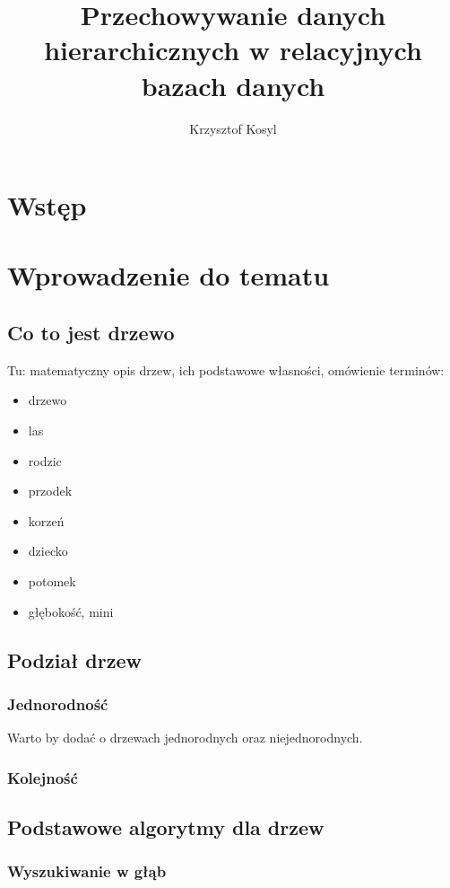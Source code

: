 \documentclass[10pt,a4paper,oneside]{book}
\author{Krzysztof Kosyl}
\title{Przechowywanie danych hierarchicznych w relacyjnych bazach danych}
\begin{document}



\tableofcontents{}

\chapter*{Wstęp}




\chapter{Wprowadzenie do tematu}

\section{Co to jest drzewo}

Tu: matematyczny opis drzew, ich podstawowe własności, omówienie terminów:
\begin{itemize}
	\item drzewo
	\item las
	\item rodzic
	\item przodek
	\item korzeń
	\item dziecko
	\item potomek
	\item głębokość, mini
\end{itemize}

\section{Podział drzew}
\subsection{Jednorodność}
Warto by dodać o drzewach jednorodnych oraz niejednorodnych.

\subsection{Kolejność}


\section{Podstawowe algorytmy dla drzew}
\subsection{Wyszukiwanie w głąb}
\end{document}
